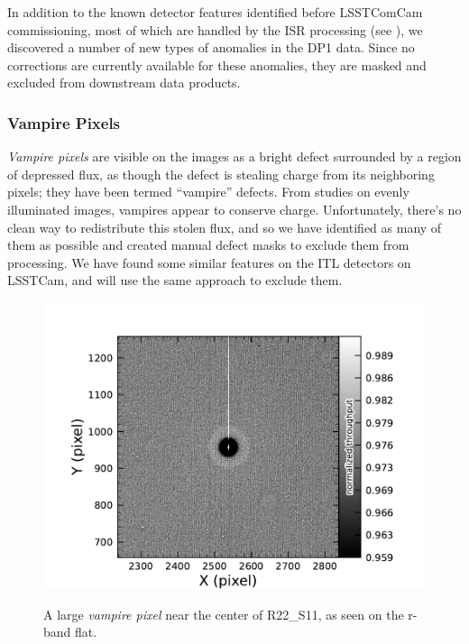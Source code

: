 In addition to the known detector features identified before LSSTComCam commissioning, most of which are handled by the ISR processing (see ), we discovered a number of new types of anomalies in the DP1 data. 
Since no corrections are currently available for these anomalies, they are masked and excluded from downstream data products.

\subsubsection{Vampire Pixels}
\textit{Vampire pixels} are visible on the images as a bright defect surrounded by a region of depressed flux, as though the defect is stealing charge from its neighboring pixels; they have been termed ``vampire'' defects.
From studies on evenly illuminated images, vampires appear to conserve charge.
Unfortunately, there's no clean way to redistribute this stolen flux, and so we have identified as many of them as possible and created manual defect masks to exclude them from processing.
We have found some similar features on the ITL detectors on LSSTCam, and will use the same approach to exclude them.
\begin{figure}[htb!]
  \centering
  \includegraphics[width=0.98\linewidth]{figures/dp1_isr_anomalies-vampire_pixel.pdf}
  \label{fig:anomalies_vampire_pixels}
  \caption{
    A large \textit{vampire pixel} near the center of R22\_S11, as seen on the r-band flat.
  }
\end{figure}

